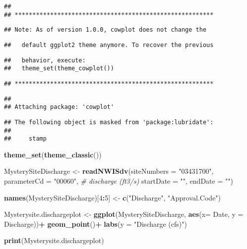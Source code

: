 \documentclass[]{article}
\newenvironment{Shaded}{\begin{snugshade}}{\end{snugshade}}
\newcommand{\CommentTok}[1]{\textcolor[rgb]{0.56,0.35,0.01}{\textit{#1}}}
\newcommand{\DataTypeTok}[1]{\textcolor[rgb]{0.13,0.29,0.53}{#1}}
\newcommand{\DecValTok}[1]{\textcolor[rgb]{0.00,0.00,0.81}{#1}}
\newcommand{\KeywordTok}[1]{\textcolor[rgb]{0.13,0.29,0.53}{\textbf{#1}}}
\newcommand{\NormalTok}[1]{#1}
\newcommand{\OperatorTok}[1]{\textcolor[rgb]{0.81,0.36,0.00}{\textbf{#1}}}
\newcommand{\StringTok}[1]{\textcolor[rgb]{0.31,0.60,0.02}{#1}}
\begin{document}
\begin{verbatim}
## 
## ********************************************************
\end{verbatim}

\begin{verbatim}
## Note: As of version 1.0.0, cowplot does not change the
\end{verbatim}

\begin{verbatim}
##   default ggplot2 theme anymore. To recover the previous
\end{verbatim}

\begin{verbatim}
##   behavior, execute:
##   theme_set(theme_cowplot())
\end{verbatim}

\begin{verbatim}
## ********************************************************
\end{verbatim}

\begin{verbatim}
## 
## Attaching package: 'cowplot'
\end{verbatim}

\begin{verbatim}
## The following object is masked from 'package:lubridate':
## 
##     stamp
\end{verbatim}

\begin{Shaded}
\begin{Highlighting}[]
\KeywordTok{theme_set}\NormalTok{(}\KeywordTok{theme_classic}\NormalTok{())}

\NormalTok{MysterySiteDischarge <-}\StringTok{ }\KeywordTok{readNWISdv}\NormalTok{(}\DataTypeTok{siteNumbers =} \StringTok{"03431700"}\NormalTok{,}
                     \DataTypeTok{parameterCd =} \StringTok{"00060"}\NormalTok{, }\CommentTok{# discharge (ft3/s)}
                     \DataTypeTok{startDate =} \StringTok{""}\NormalTok{,}
                     \DataTypeTok{endDate =} \StringTok{""}\NormalTok{)}

\KeywordTok{names}\NormalTok{(MysterySiteDischarge)[}\DecValTok{4}\OperatorTok{:}\DecValTok{5}\NormalTok{] <-}\StringTok{ }\KeywordTok{c}\NormalTok{(}\StringTok{"Discharge"}\NormalTok{, }\StringTok{"Approval.Code"}\NormalTok{)}

\NormalTok{Mysterysite.dischargeplot <-}\StringTok{ }\KeywordTok{ggplot}\NormalTok{(MysterySiteDischarge, }\KeywordTok{aes}\NormalTok{(}\DataTypeTok{x=}\NormalTok{ Date, }\DataTypeTok{y =}\NormalTok{ Discharge))}\OperatorTok{+}
\StringTok{  }\KeywordTok{geom_point}\NormalTok{()}\OperatorTok{+}
\StringTok{  }\KeywordTok{labs}\NormalTok{(}\DataTypeTok{y =} \StringTok{"Discharge (cfs)"}\NormalTok{)}

\KeywordTok{print}\NormalTok{(Mysterysite.dischargeplot)}
\end{Highlighting}
\end{Shaded}
\end{document}

